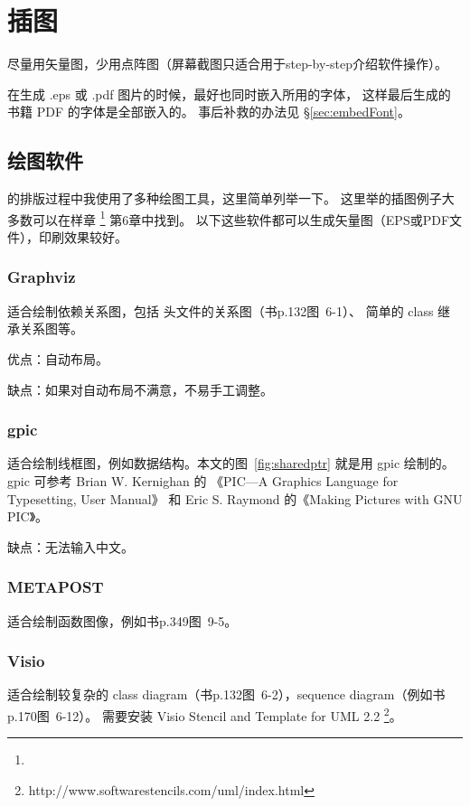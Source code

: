 \chapter{插图}

尽量用矢量图，少用点阵图（屏幕截图只适合用于step-by-step介绍软件操作）。

在生成 {} .eps 或 {} .pdf 图片的时候，最好也同时嵌入所用的字体，
这样最后生成的书籍 PDF 的字体是全部嵌入的。
事后补救的办法见 \S \ref{sec:embedFont}。

\section{绘图软件}

\mybooktitle 的排版过程中我使用了多种绘图工具，这里简单列举一下。
这里举的插图例子大多数可以在样章 \footnote{} 第6章中找到。
以下这些软件都可以生成矢量图（EPS或PDF文件），印刷效果较好。

\subsection{Graphviz}
适合绘制依赖关系图，包括  头文件的关系图（书p.132图~6-1）、
简单的 class 继承关系图等。

优点：自动布局。

缺点：如果对自动布局不满意，不易手工调整。
\subsection{gpic}

适合绘制线框图，例如数据结构。本文的图~\ref{fig:sharedptr} 就是用 gpic 绘制的。
gpic 可参考 Brian W. Kernighan 的 《PIC---A Graphics Language for Typesetting, User Manual》
和 Eric S. Raymond 的《Making Pictures with GNU PIC》。

缺点：无法输入中文。

\subsection{METAPOST}
适合绘制函数图像，例如书p.349图~9-5。

\subsection{Visio}
适合绘制较复杂的 class diagram（书p.132图~6-2），sequence diagram（例如书p.170图~6-12）。
需要安装 	
Visio Stencil and Template for UML 2.2
\footnote{http://www.softwarestencils.com/uml/index.html}。

